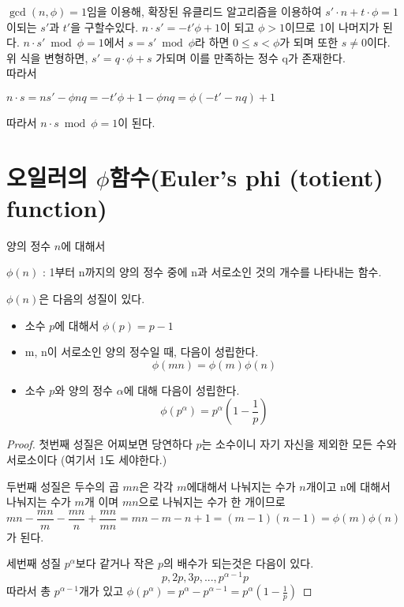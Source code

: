 $\gcd(n,\phi)=1$임을 이용해, 확장된 유클리드 알고리즘을 이용하여 $s'\cdot n + t \cdot \phi = 1$이되는 $s'$과 $t'$을 구할수있다. 
$n\cdot s'= -t'\phi+1$이 되고 $\phi>1$이므로 1이 나머지가 된다.
$n\cdot s'\bmod  \phi =1$에서 $s= s'\bmod  \phi$라 하면 $0 \le s <\phi$가 되며 또한 $s  \ne 0$이다.\\
위 식을 변형하면, $s'=q\cdot \phi +s$ 가되며 이를 만족하는 정수 q가 존재한다. \\
따라서 
\begin{center}
    $n\cdot s=ns'-\phi nq=-t'\phi +1 -\phi nq=\phi(-t'-nq)+1 $
\end{center}
따라서 $n\cdot s\bmod  \phi =1 $이 된다.








\section{오일러의 $\phi$함수(Euler’s phi (totient) function)}
\begin{dfn}
    양의 정수 $n$에 대해서 

    $\phi (n)$ : 1부터 n까지의 양의 정수 중에 n과 서로소인 것의 개수를 나타내는 함수.    
\end{dfn}

$\phi (n)$은 다음의 성질이 있다.

\begin{theorem}
    
    \begin{itemize}
        \item{소수 $p$에 대해서  $\phi (p)=p-1$}
        
        \item{ m, n이 서로소인 양의 정수일 때, 다음이 성립한다. \[\phi (mn)=\phi (m)\phi (n)\]}
        
        \item 소수 $p$와 양의 정수 $\alpha$에 대해 다음이 성립한다.
        $$\phi(p^\alpha) = p^\alpha \left ( 1 - \frac{1}{p} \right )$$
        \end{itemize}
\end{theorem}

\begin{proof}

첫번째 성질은 어찌보면 당연하다 $p$는 소수이니 자기 자신을 제외한 모든 수와 서로소이다 (여기서 1도 세야한다.)


두번째 성질은 두수의 곱 $mn$은 각각 $m$에대해서 나눠지는 수가 $n$개이고 n에 대해서 나눠지는 수가 $m$개 이며 $mn$으로 나눠지는 수가 한 개이므로 
$mn -\dfrac{mn}{m}-\dfrac{mn}{n}+\dfrac{mn}{mn} =mn -m -n +1=(m-1)(n-1)=\phi (m)\phi(n)$가 된다.

세번째 성질 $p^\alpha$보다 같거나 작은 $p$의 배수가 되는것은 다음이 있다.
$$p , 2p , 3p , ... , p^{\alpha-1}p$$
따라서 총 $p^{\alpha-1}$개가 있고 
$ \phi(p^\alpha) =p^{\alpha} -  p^{\alpha-1} = p^\alpha \left ( 1 - \frac{1}{p} \right )$

\end{proof}

